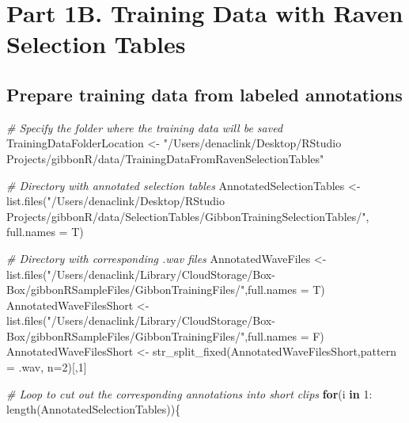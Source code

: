 \documentclass[
]{book}
\newenvironment{Shaded}{\begin{snugshade}}{\end{snugshade}}
\newcommand{\AttributeTok}[1]{\textcolor[rgb]{0.77,0.63,0.00}{#1}}
\newcommand{\CommentTok}[1]{\textcolor[rgb]{0.56,0.35,0.01}{\textit{#1}}}
\newcommand{\ControlFlowTok}[1]{\textcolor[rgb]{0.13,0.29,0.53}{\textbf{#1}}}
\newcommand{\DecValTok}[1]{\textcolor[rgb]{0.00,0.00,0.81}{#1}}
\newcommand{\FunctionTok}[1]{\textcolor[rgb]{0.00,0.00,0.00}{#1}}
\newcommand{\NormalTok}[1]{#1}
\newcommand{\OtherTok}[1]{\textcolor[rgb]{0.56,0.35,0.01}{#1}}
\newcommand{\SpecialCharTok}[1]{\textcolor[rgb]{0.00,0.00,0.00}{#1}}
\newcommand{\StringTok}[1]{\textcolor[rgb]{0.31,0.60,0.02}{#1}}
\begin{document}
\hypertarget{part-1b.-training-data-with-raven-selection-tables}{%
\section{Part 1B. Training Data with Raven Selection Tables}\label{part-1b.-training-data-with-raven-selection-tables}}

\hypertarget{prepare-training-data-from-labeled-annotations}{%
\subsection{Prepare training data from labeled annotations}\label{prepare-training-data-from-labeled-annotations}}

\begin{Shaded}
\begin{Highlighting}[]
\CommentTok{\# Specify the folder where the training data will be saved}
\NormalTok{TrainingDataFolderLocation }\OtherTok{\textless{}{-}} \StringTok{"/Users/denaclink/Desktop/RStudio Projects/gibbonR/data/TrainingDataFromRavenSelectionTables"}

\CommentTok{\# Directory with annotated selection tables}
\NormalTok{AnnotatedSelectionTables }\OtherTok{\textless{}{-}} \FunctionTok{list.files}\NormalTok{(}\StringTok{"/Users/denaclink/Desktop/RStudio Projects/gibbonR/data/SelectionTables/GibbonTrainingSelectionTables/"}\NormalTok{,}
                                       \AttributeTok{full.names =}\NormalTok{ T)}

\CommentTok{\# Directory with corresponding .wav files}
\NormalTok{AnnotatedWaveFiles }\OtherTok{\textless{}{-}} \FunctionTok{list.files}\NormalTok{(}\StringTok{"/Users/denaclink/Library/CloudStorage/Box{-}Box/gibbonRSampleFiles/GibbonTrainingFiles/"}\NormalTok{,}\AttributeTok{full.names =}\NormalTok{ T)}
\NormalTok{AnnotatedWaveFilesShort }\OtherTok{\textless{}{-}} \FunctionTok{list.files}\NormalTok{(}\StringTok{"/Users/denaclink/Library/CloudStorage/Box{-}Box/gibbonRSampleFiles/GibbonTrainingFiles/"}\NormalTok{,}\AttributeTok{full.names =}\NormalTok{ F)}
\NormalTok{AnnotatedWaveFilesShort }\OtherTok{\textless{}{-}} \FunctionTok{str\_split\_fixed}\NormalTok{(AnnotatedWaveFilesShort,}\AttributeTok{pattern =} \StringTok{\textquotesingle{}.wav\textquotesingle{}}\NormalTok{, }\AttributeTok{n=}\DecValTok{2}\NormalTok{)[,}\DecValTok{1}\NormalTok{]}

\CommentTok{\# Loop to cut out the corresponding annotations into short clips}
\ControlFlowTok{for}\NormalTok{(i }\ControlFlowTok{in} \DecValTok{1}\SpecialCharTok{:} \FunctionTok{length}\NormalTok{(AnnotatedSelectionTables))\{}
  

\end{Highlighting}
\end{Shaded}
\end{document}
